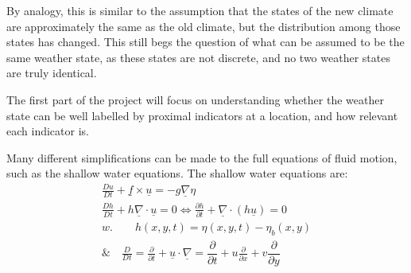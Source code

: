 \documentclass[usenames, dvipsnames, twocolumn]{article}
\begin{document}
By analogy, this is similar to the assumption that the states of the new climate are approximately the same as the old climate, but the distribution among those states has changed. This still begs the question of what can be assumed to be the same weather state, as these states are not discrete, and no two weather states are truly identical.

The first part of the project will focus on understanding
whether the weather state can be well labelled by proximal
indicators at a location, and how relevant each indicator is.

Many different simplifications can be made to the full equations of fluid motion, such as the shallow water equations.
The shallow water equations are:
    \begin{eqnarray}
    \frac{Du}{Dt} + \underline{f}\times\underline{u} = - g \underline{\nabla} \eta \; \\
\frac{Dh}{Dt} + h \underline{\nabla}\cdot\underline{u} = 0  \Leftrightarrow \frac{\partial h}{\partial t} + \underline{\nabla}\cdot(h\underline{u})= 0 \\
w. \quad \quad h(x, y , t) = \eta(x, y, t) - \eta_{b}(x, y)\\
\& \quad \frac{D}{Dt}= \frac{\partial}{\partial t} + \underline{u}\cdot\underline{\nabla} = \dfrac{\partial}{\partial t} + u \frac{\partial}{\partial x} + v \dfrac{\partial}{\partial y}
    \end{eqnarray}
\end{document}
